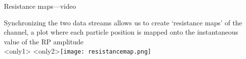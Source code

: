 

\begin{frame}[c]{Resistance maps---video}
	
	Synchronizing the two data streams allows us to create `resistance maps' of the channel, a plot where each particle position is mapped onto the instantaneous value of the RP amplitude \\
	\vspace{.2in}
	<only1>{}
	<only2>{\texttt{[image: resistancemap.png]}}
	
\end{frame}

